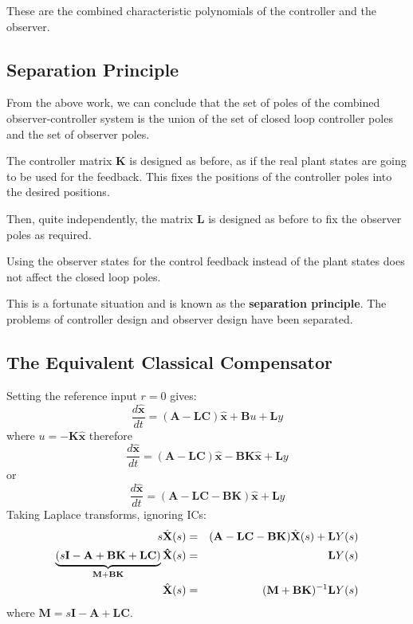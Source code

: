 These are the combined characteristic polynomials of the controller and the observer.





\subsection*{Separation Principle} %
\label{sub:separation_principle}

From the above work, we can conclude that the set of poles of the combined observer-controller system is the union of the set of closed loop controller poles and the set of observer poles.

The controller matrix  $\mathbf{K}$  is designed as before, as if the real plant states are going to be used for the feedback. This fixes the positions of the controller poles into the desired positions.

Then, quite independently, the matrix $\mathbf{L}$ is designed as before to fix the observer poles as required.

Using the observer states for the control feedback instead of the plant states does not affect the closed loop poles.

This is a fortunate situation and is known as the \textbf{separation principle}. The problems of controller design and observer design have been separated.
 


\subsection*{The Equivalent Classical Compensator} %
\label{sec:the_equivalent_classical_compensator}


\ifslidesonly
\begin{slide}
   
\end{slide}
\fi


Setting the reference input $r = 0$  gives:
\[
\frac{d\hat{\mathbf{x}}}{dt}=(\mathbf{A}-\mathbf{LC})\hat{\mathbf{x}}+ \mathbf{B}u+\mathbf{L}y
\]
where $u=-\mathbf{K}\hat{\mathbf{x}}$ therefore
\[
\frac{d\hat{\mathbf{x}}}{dt}=(\mathbf{A}-\mathbf{LC})\hat{\mathbf{x}} - \mathbf{BK}\hat{\mathbf{x}}+\mathbf{L}y
\]
or
\[
\frac{d\hat{\mathbf{x}}}{dt}=(\mathbf{A} - \mathbf{LC} - \mathbf{BK})\hat{\mathbf{x}} + \mathbf{L}y
\]
Taking Laplace transforms, ignoring ICs:
\begin{eqnarray*}
s\hat{\mathbf{X}}(s) & = & (\mathbf{A} - \mathbf{LC} - \mathbf{BK})\hat{\mathbf{X}}(s) + \mathbf{L}Y(s) \\	
\underbrace {(s{\bf{I}} - {\bf{A}} + {\bf{BK}} + {\bf{LC}})}_{{\bf{M + BK}}}{\bf{\hat X}}(s) & = & {\bf{L}}Y(s) \\
\hat{\mathbf{X}}(s) & = & (\mathbf{M}+\mathbf{BK})^{-1}{\bf{L}}Y(s)
\end{eqnarray*}
where $\mathbf{M}=s\mathbf{I}-\mathbf{A}+\mathbf{LC}$.
 
